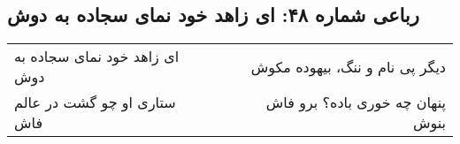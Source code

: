 \begin{center}
\section*{رباعی شماره ۴۸: ای زاهد خود نمای سجاده به دوش}
\label{sec:048}
\begin{longtable}{l p{0.5cm} r}
ای زاهد خود نمای سجاده به دوش
&&
دیگر پی نام و ننگ، بیهوده مکوش
\\
ستاری او چو گشت در عالم فاش
&&
پنهان چه خوری باده؟ برو فاش بنوش
\\
\end{longtable}
\end{center}
